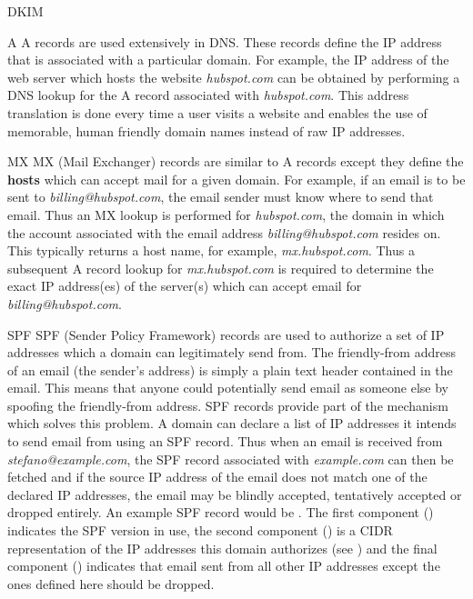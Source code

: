 \begin{labeling}{DKIM }
  \item[A] A records are used extensively in DNS. These records define the IP address that is associated with a particular domain. For example, the IP address of the web server which hosts the website \textit{hubspot.com} can be obtained by performing a DNS lookup for the A record associated with \textit{hubspot.com}. This address translation is done every time a user visits a website and enables the use of memorable, human friendly domain names instead of raw IP addresses.
  \item[MX] MX (Mail Exchanger) records are similar to A records except they define the \textbf{hosts} which can accept mail for a given domain. For example, if an email is to be sent to \textit{billing@hubspot.com}, the email sender must know where to send that email. Thus an MX lookup is performed for \textit{hubspot.com}, the domain in which the account associated with the email address \textit{billing@hubspot.com} resides on. This typically returns a host name, for example, \textit{mx.hubspot.com}. Thus a subsequent A record lookup for \textit{mx.hubspot.com} is required to determine the exact IP address(es) of the server(s) which can accept email for \textit{billing@hubspot.com}.
  \item[SPF] SPF (Sender Policy Framework) records are used to authorize a set of IP addresses which a domain can legitimately send from. The friendly-from address of an email (the sender's address) is simply a plain text header contained in the email. This means that anyone could potentially send email as someone else by spoofing the friendly-from address. SPF records provide part of the mechanism which solves this problem. A domain can declare a list of IP addresses it intends to send email from using an SPF record. Thus when an email is received from \textit{stefano@example.com}, the SPF record associated with \textit{example.com} can then be fetched and if the source IP address of the email does not match one of the declared IP addresses, the email may be blindly accepted, tentatively accepted or dropped entirely. An example SPF record would be . The first component () indicates the SPF version in use, the second component () is a CIDR representation of the IP addresses this domain authorizes (see ) and the final component () indicates that email sent from all other IP addresses except the ones defined here should be dropped. 

\end{labeling}
